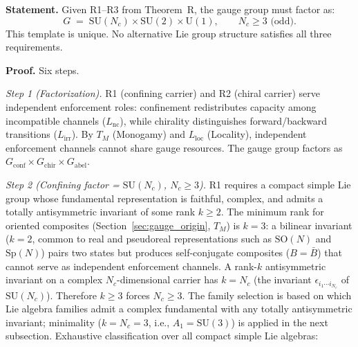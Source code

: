 \documentclass[11pt]{article}
\newcommand{\SU}{\mathrm{SU}}
\newcommand{\U}{\mathrm{U}}
\begin{document}
\begin{tcolorbox}[apfbox, title={Lemma $L_{\mathrm{gauge,unique}}$ (Gauge Template Uniqueness)}]
\textbf{Statement.}  Given R1--R3 from Theorem~R, the gauge group must factor as:
\begin{equation}
G \;=\; \SU(N_c) \times \SU(2) \times \U(1), \qquad N_c \ge 3 \text{ (odd)}.
\label{eq:gauge_template}
\end{equation}
This template is unique.  No alternative Lie group structure satisfies all three requirements.

\smallskip\noindent\textbf{Proof.}  Six steps.

\medskip\noindent\textit{Step 1 (Factorization).}  R1 (confining carrier) and R2 (chiral carrier) serve independent enforcement roles: confinement redistributes capacity among incompatible channels ($L_{\mathrm{nc}}$), while chirality distinguishes forward/backward transitions ($L_{\mathrm{irr}}$).  By $T_M$ (Monogamy) and $L_{\mathrm{loc}}$ (Locality), independent enforcement channels cannot share gauge resources.  The gauge group factors as $G_{\mathrm{conf}} \times G_{\mathrm{chir}} \times G_{\mathrm{abel}}$.

\medskip\noindent\textit{Step 2 (Confining factor = $\SU(N_c)$, $N_c \ge 3$).}  R1 requires a compact simple Lie group whose fundamental representation is faithful, complex, and admits a totally antisymmetric invariant of some rank $k \ge 2$.  The minimum rank for oriented composites (Section~\ref{sec:gauge_origin}, $T_M$) is $k = 3$: a bilinear invariant ($k=2$, common to real and pseudoreal representations such as $\mathrm{SO}(N)$ and $\mathrm{Sp}(N)$) pairs two states but produces self-conjugate composites ($B = \bar{B}$) that cannot serve as independent enforcement channels.  A rank-$k$ antisymmetric invariant on a complex $N_c$-dimensional carrier has $k = N_c$ (the invariant $\epsilon_{i_1 \cdots i_{N_c}}$ of $\SU(N_c)$).  Therefore $k \ge 3$ forces $N_c \ge 3$.  The family selection is based on which Lie algebra families admit a complex fundamental with any totally antisymmetric invariant; minimality ($k = N_c = 3$, i.e., $A_1 = \SU(3)$) is applied in the next subsection.  Exhaustive classification over all compact simple Lie algebras:


\end{tcolorbox}
\end{document}
